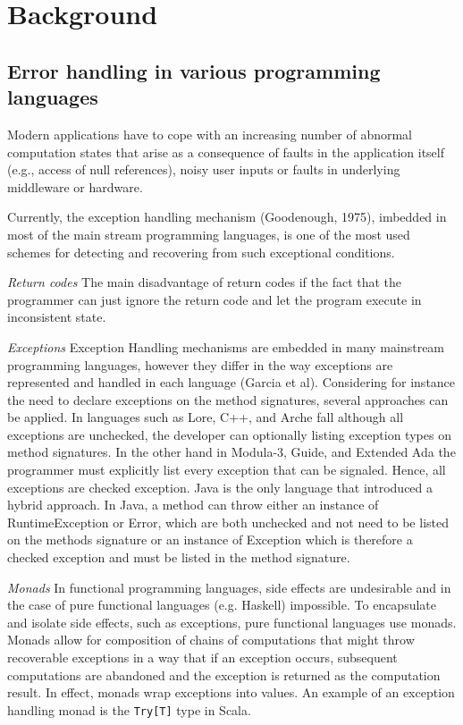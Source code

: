 \documentclass[conference]{IEEEtran}
\begin{document}

\section{Background}

\subsection{Error handling in various programming languages}

Modern applications have to cope with an increasing number of abnormal computation states that arise as a consequence of faults in the application itself (e.g., access of null references), noisy user inputs or faults in underlying middleware or hardware. 

Currently, the exception handling mechanism (Goodenough, 1975), imbedded in most of the main stream programming languages, is one of the most used schemes for detecting and recovering from such exceptional conditions.


\noindent\emph{Return codes}
The main disadvantage of return codes if the fact that the programmer can just ignore the return code and let the program execute in inconsistent state.
    

\noindent\emph{Exceptions}
 Exception Handling mechanisms are embedded in many mainstream programming languages, however they differ in the way exceptions are represented and handled in each language (Garcia et al). Considering for instance the need to declare exceptions on the method signatures, several approaches can be applied. In languages such as Lore, C++, and Arche fall although all exceptions are unchecked, the developer can optionally listing exception types on method signatures. In the other hand in Modula-3, Guide, and Extended Ada the programmer must explicitly list every exception that can be signaled. Hence, all exceptions are checked exception. Java is the only language that introduced a hybrid approach. In Java, a method can throw either an instance of RuntimeException or Error, which are both unchecked and not need to be listed on the methods signature or an instance of Exception which is therefore a checked exception and must be listed in the method signature. 

\noindent\emph{Monads}
    In functional programming languages, side effects are undesirable and in
    the case of pure functional languages (e.g. Haskell) impossible. To encapsulate and 
    isolate side effects, such as exceptions, pure functional languages use monads. Monads 
    allow for composition of chains of computations that might throw recoverable exceptions 
    in a way that if an exception occurs, subsequent computations are abandoned and the 
    exception is returned as the computation result. In effect, monads wrap exceptions into
    values. An example of an exception handling monad is the \texttt{Try[T]} type in Scala. 
\end{document}
